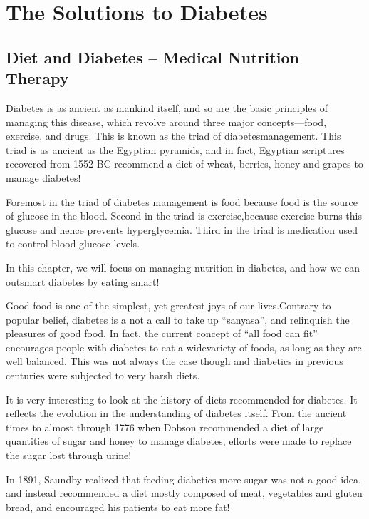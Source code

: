 
\part{The Solutions to Diabetes}

\chapter{Diet and Diabetes – Medical Nutrition Therapy}\label{chap22}

Diabetes is as ancient as mankind itself, and so are the basic principles of managing this disease, which revolve around three major concepts—food, exercise, and drugs. This is known as the triad of diabetes\break management. This triad is as ancient as the Egyptian pyramids, and in fact, Egyptian scriptures recovered from 1552 BC recommend a diet of wheat, berries, honey and grapes to manage diabetes!

Foremost in the triad of diabetes management is food because food is the source of glucose in the blood. Second in the triad is exercise,\break because exercise burns this glucose and hence prevents hyperglycemia. Third in the triad is medication used to control blood glucose levels.

In this chapter, we will focus on managing nutrition in diabetes, and how we can outsmart diabetes by eating smart!

Good food is one of the simplest, yet greatest joys of our lives.\break Contrary to popular belief, diabetes is a not a call to take up “sanyasa”, and relinquish the pleasures of good food. In fact, the current concept of “all food can fit” encourages people with diabetes to eat a wide\break variety of foods, as long as they are well balanced. This was not always the case though and diabetics in previous centuries were subjected to very harsh diets.


It is very interesting to look at the history of diets recommended for diabetes. It reflects the evolution in the understanding of diabetes itself. From the ancient times to almost through 1776 when Dobson recommended a diet of large quantities of sugar and honey to manage diabetes, efforts were made to replace the sugar lost through urine!

In 1891, Saundby realized that feeding diabetics more sugar was not a good idea, and instead recommended a diet mostly composed of meat, vegetables and gluten bread, and encouraged his patients to eat more fat!

